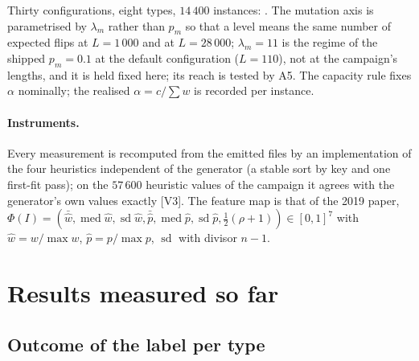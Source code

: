 \documentclass[a4paper,11pt]{article}
\newcommand{\code}[1]{\path{#1}}
\newcommand{\evid}[1]{\textcolor{inkSoft}{\scriptsize[#1]}}
\theoremstyle{plain}
\theoremstyle{definition}
\theoremstyle{remark}
\begin{document}
Thirty configurations, eight types, $14\,400$ instances: \code{runs/pisinger_main}. The
mutation axis is parametrised by $\lambda_m$ rather than $p_m$ so that a level means the
same number of expected flips at $L=1\,000$ and at $L=28\,000$; $\lambda_m=11$ is the
regime of the shipped $p_m=0.1$ at the default configuration ($L=110$), not at the
campaign's lengths, and it is held fixed here; its reach is tested by A5. The capacity rule fixes
$\alpha$ nominally; the realised $\alpha=c/\sum w$ is recorded per instance.

\paragraph{Instruments.} Every measurement is recomputed from the emitted \code{.kp} files
by an implementation of the four heuristics independent of the generator (a stable sort by
key and one first-fit pass); on the $57\,600$ heuristic values of the campaign it agrees with
the generator's own values exactly \evid{V3}. The feature map is that of the 2019 paper,
$\Phi(I)=(\bar{\hat w},\operatorname{med}\hat w,\operatorname{sd}\hat w,\bar{\hat p},
\operatorname{med}\hat p,\operatorname{sd}\hat p,\tfrac12(\rho+1))\in[0,1]^{7}$ with
$\hat w=w/\max w$, $\hat p=p/\max p$, $\operatorname{sd}$ with divisor $n-1$.

\section{Results measured so far}\label{sec:results}

\subsection{Outcome of the label per type}
\end{document}
